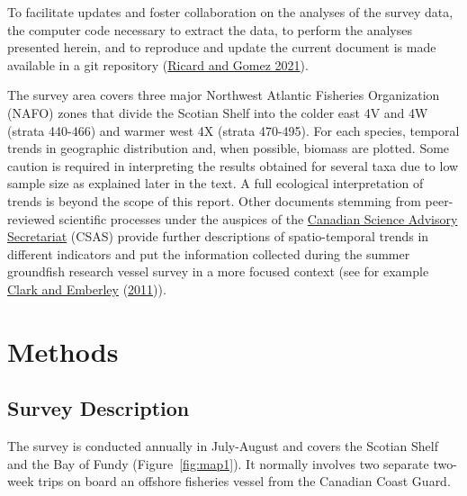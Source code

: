 \documentclass[12pt]{article}\usepackage[]{graphicx}\usepackage[]{color}
\begin{document}
To facilitate updates and foster collaboration on the analyses of the survey data, the computer code necessary to extract the data, to perform the analyses presented herein, and to reproduce and update the current document is made available in a git repository (\protect\hyperlink{ref-Ricard-Gomez-2021}{Ricard and Gomez 2021}).

The survey area covers three major Northwest Atlantic Fisheries Organization (NAFO) zones that divide the Scotian Shelf into the colder east 4V and 4W (strata 440-466) and warmer west 4X (strata 470-495). For each species, temporal trends in geographic distribution and, when possible, biomass are plotted. Some caution is required in interpreting the results obtained for several taxa due to low sample size as explained later in the text. A full ecological interpretation of trends is beyond the scope of this report. Other documents stemming from peer-reviewed scientific processes under the auspices of the \href{https://www.dfo-mpo.gc.ca/csas-sccs/}{Canadian Science Advisory Secretariat} (CSAS) provide further descriptions of spatio-temporal trends in different indicators and put the information collected during the summer groundfish research vessel survey in a more focused context (see for example \protect\hyperlink{ref-ClarkEmberley2011}{Clark and Emberley} (\protect\hyperlink{ref-ClarkEmberley2011}{2011})).

\hypertarget{methods}{%
\section{Methods}\label{methods}}

\hypertarget{survey-description}{%
\subsection{Survey Description}\label{survey-description}}

The survey is conducted annually in July-August and covers the Scotian Shelf and the Bay of Fundy (Figure~\ref{fig:map1}). It normally involves two separate two-week trips on board an offshore fisheries vessel from the Canadian Coast Guard.
\end{document}
